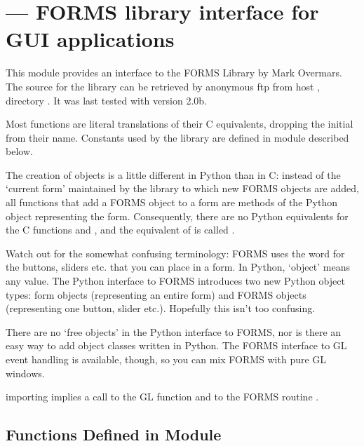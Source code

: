 \section{ ---
         FORMS library interface for GUI applications}



This module provides an interface to the FORMS Library by Mark Overmars.  The source for the
library can be retrieved by anonymous ftp from host
, directory .  It was last tested
with version 2.0b.

Most functions are literal translations of their C equivalents,
dropping the initial  from their name.  Constants used by
the library are defined in module  described below.

The creation of objects is a little different in Python than in C:
instead of the `current form' maintained by the library to which new
FORMS objects are added, all functions that add a FORMS object to a
form are methods of the Python object representing the form.
Consequently, there are no Python equivalents for the C functions
 and , and the
equivalent of  is called
.

Watch out for the somewhat confusing terminology: FORMS uses the word
 for the buttons, sliders etc. that you can place in a form.
In Python, `object' means any value.  The Python interface to FORMS
introduces two new Python object types: form objects (representing an
entire form) and FORMS objects (representing one button, slider etc.).
Hopefully this isn't too confusing.

There are no `free objects' in the Python interface to FORMS, nor is
there an easy way to add object classes written in Python.  The FORMS
interface to GL event handling is available, though, so you can mix
FORMS with pure GL windows.

 importing  implies a call to the GL
function  and to the FORMS routine
.

\subsection{Functions Defined in Module }

